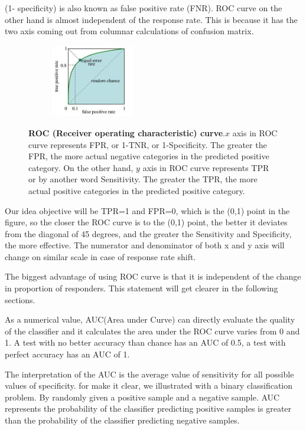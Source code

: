 (1- specificity) is also known as false positive rate (FNR). ROC curve on the other hand is almost independent of the response rate. This is because it has the two axis coming out from columnar calculations of confusion matrix.

\begin{figure}[h]
	\begin{center}
		\begin{subfigure}[b]{\textwidth}
		    \centering
			\includegraphics[width=0.4\textwidth]{thesis-template-master/images/ROC.JPG}
			\label{fig:cellnet}
		\end{subfigure}
	\end{center}
	\caption{\textbf{ROC (Receiver operating characteristic) curve}.$x$ axis in ROC curve represents FPR, or 1-TNR, or 1-Specificity. The greater the FPR, the more actual negative categories in the predicted positive category. On the other hand, $y$ axis in ROC curve represents TPR or by another word Sensitivity. The greater the TPR, the more actual positive categories in the predicted positive category.}
\end{figure}
Our idea objective will be TPR=1 and FPR=0, which is the (0,1) point in the figure, so the closer the ROC curve is to the (0,1) point, the better it deviates from the diagonal of 45 degrees, and the greater the Sensitivity and Specificity, the more effective.
The numerator and denominator of both x and y axis will change on similar scale in case of response rate shift.

The biggest advantage of using ROC curve is that it is independent of the change in proportion of responders. This statement will get clearer in the following sections.

As a numerical value, AUC(Area under Curve) can directly evaluate the quality of the classifier and it calculates the area under the ROC curve varies from 0 and 1. A test with no better accuracy than chance has an AUC of 0.5, a test with perfect accuracy has an AUC of 1.

The interpretation of the AUC is the average value of sensitivity for all possible values of specificity. for make it clear, we illustrated with a binary  classification problem. By randomly given a positive sample and a negative sample. AUC represents the probability of the classifier predicting positive samples is greater than the probability of the classifier predicting negative samples.%


